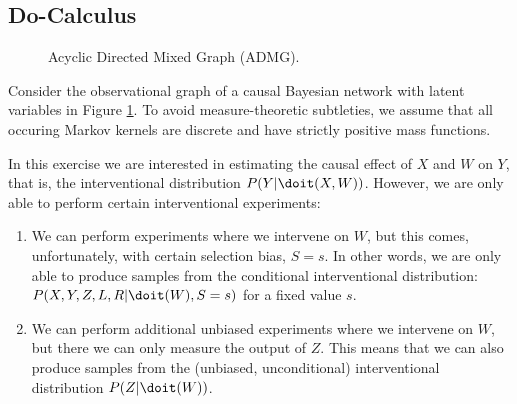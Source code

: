 \subsection{Do-Calculus}

\begin{figure}[ht]
\centering
{}
\caption{Acyclic Directed Mixed Graph (ADMG).}
\label{fig:cadmg-1}
\end{figure}

\noindent Consider the observational graph of a causal Bayesian network with latent variables in Figure \ref{fig:cadmg-1}.
To avoid measure-theoretic subtleties, we assume that all occuring Markov kernels are discrete and have strictly positive mass functions.

In this exercise we are interested in estimating the causal effect of $X$ and $W$ on $Y$, that is, the interventional distribution $P(Y|\doit(X,W))$. However, we are only able to perform certain interventional experiments:
\begin{enumerate}[label=(\arabic*)]
    \item We can perform experiments where we intervene on $W$, but this comes, unfortunately, with certain selection bias, $S=s$. In other words, we are only able to produce samples from the conditional interventional distribution: $P(X,Y,Z,L,R|\doit(W),S=s)$ for a fixed value $s$.
    \item We can perform additional unbiased experiments where we intervene on $W$, but there we can only measure the output of $Z$. This means that we can also produce samples from the (unbiased, unconditional)  interventional distribution $P(Z|\doit(W))$.
\end{enumerate}


